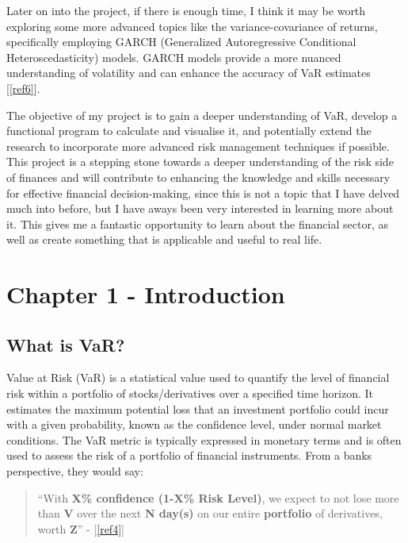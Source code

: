 \documentclass{article}
\begin{document}
Later on into the project, if there is enough time, I think it may be worth exploring some more advanced topics like the variance-covariance of returns, specifically employing GARCH (Generalized Autoregressive Conditional Heteroscedasticity) models. GARCH models provide a more nuanced understanding of volatility and can enhance the accuracy of VaR estimates [\ref{ref6}].\\\vspace{0.3cm}

The objective of my project is to gain a deeper understanding of VaR, develop a functional program to calculate and visualise it, and potentially extend the research to incorporate more advanced risk management techniques if possible. This project is a stepping stone towards a deeper understanding of the risk side of finances and will contribute to enhancing the knowledge and skills necessary for effective financial decision-making, since this is not a topic that I have delved much into before, but I have aways been very interested in learning more about it. This gives me a fantastic opportunity to learn about the financial sector, as well as create something that is applicable and useful to real life. \\



\newpage
\section{Chapter 1 - Introduction}

\subsection{What is VaR?}

Value at Risk (VaR) is a statistical value used to quantify the level of financial risk within a portfolio of stocks/derivatives over a specified time horizon. It estimates the maximum potential loss that an investment portfolio could incur with a given probability, known as the confidence level, under normal market conditions. The VaR metric is typically expressed in monetary terms and is often used to assess the risk of a portfolio of financial instruments. From a banks perspective, they would say:
\begin{quote}
  ``With \textbf{X\% confidence (1-X\% Risk Level)}, we expect to not lose more than \textbf{V} over the next \textbf{N day(s)} on our entire \textbf{portfolio} of derivatives, worth \textbf{Z}'' - [\ref{ref4}]

\end{quote}
\end{document}
